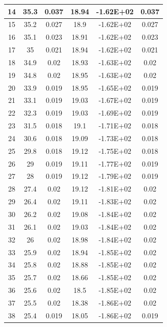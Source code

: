 \documentclass{THUexprep}
\begin{document}
\begin{longtable}{|c|c|c|c|c|c|}
    \hline
    14    & 35.3  & 0.037 & 18.94 & -1.62E+02 & 0.037 \\
    \hline
    15    & 35.2  & 0.027 & 18.9  & -1.62E+02 & 0.027 \\
    \hline
    16    & 35.1  & 0.023 & 18.91 & -1.62E+02 & 0.023 \\
    \hline
    17    & 35    & 0.021 & 18.94 & -1.62E+02 & 0.021 \\
    \hline
    18    & 34.9  & 0.02  & 18.93 & -1.63E+02 & 0.02 \\
    \hline
    19    & 34.8  & 0.02  & 18.95 & -1.63E+02 & 0.02 \\
    \hline
    20    & 33.9  & 0.019 & 18.95 & -1.65E+02 & 0.019 \\
    \hline
    21    & 33.1  & 0.019 & 19.03 & -1.67E+02 & 0.019 \\
    \hline
    22    & 32.3  & 0.019 & 19.03 & -1.69E+02 & 0.019 \\
    \hline
    23    & 31.5  & 0.018 & 19.1  & -1.71E+02 & 0.018 \\
    \hline
    24    & 30.6  & 0.018 & 19.09 & -1.73E+02 & 0.018 \\
    \hline
    25    & 29.8  & 0.018 & 19.12 & -1.75E+02 & 0.018 \\
    \hline
    26    & 29    & 0.019 & 19.11 & -1.77E+02 & 0.019 \\
    \hline
    27    & 28    & 0.019 & 19.12 & -1.79E+02 & 0.019 \\
    \hline
    28    & 27.4  & 0.02  & 19.12 & -1.81E+02 & 0.02 \\
    \hline
    29    & 26.4  & 0.02  & 19.11 & -1.83E+02 & 0.02 \\
    \hline
    30    & 26.2  & 0.02  & 19.08 & -1.84E+02 & 0.02 \\
    \hline
    31    & 26.1  & 0.02  & 19.03 & -1.84E+02 & 0.02 \\
    \hline
    32    & 26    & 0.02  & 18.98 & -1.84E+02 & 0.02 \\
    \hline
    33    & 25.9  & 0.02  & 18.94 & -1.85E+02 & 0.02 \\
    \hline
    34    & 25.8  & 0.02  & 18.88 & -1.85E+02 & 0.02 \\
    \hline
    35    & 25.7  & 0.02  & 18.66 & -1.85E+02 & 0.02 \\
    \hline
    36    & 25.6  & 0.02  & 18.5  & -1.85E+02 & 0.02 \\
    \hline
    37    & 25.5  & 0.02  & 18.38 & -1.86E+02 & 0.02 \\
    \hline
    38    & 25.4  & 0.019 & 18.05 & -1.86E+02 & 0.019 \\

\end{longtable}
\end{document}
